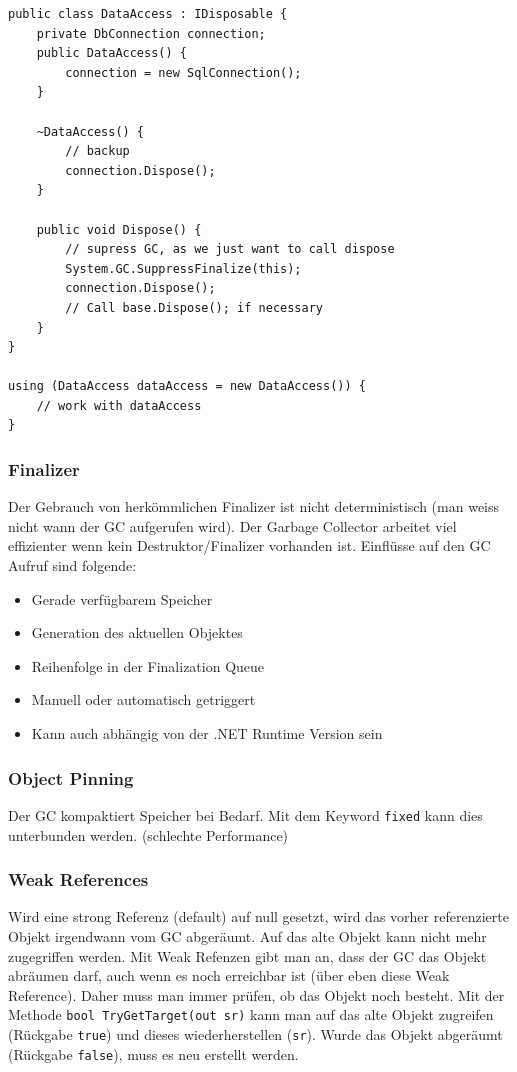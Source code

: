 \documentclass[
a4paper,
oneside,
10pt,
fleqn,
headsepline,
toc=listofnumbered, 
bibliography=totocnumbered]{scrartcl}
\begin{document}
\begin{lstlisting}
public class DataAccess : IDisposable {
	private DbConnection connection;
	public DataAccess() { 
		connection = new SqlConnection();
	}
	
	~DataAccess() {
		// backup
		connection.Dispose(); 
	}
	
	public void Dispose() {
		// supress GC, as we just want to call dispose
		System.GC.SuppressFinalize(this);
		connection.Dispose();
		// Call base.Dispose(); if necessary
	}
}

using (DataAccess dataAccess = new DataAccess()) {
	// work with dataAccess
}
\end{lstlisting}

\subsubsection{Finalizer} Der Gebrauch von herkömmlichen Finalizer ist nicht deterministisch (man weiss nicht wann der GC aufgerufen wird). Der Garbage Collector arbeitet viel effizienter wenn kein Destruktor/Finalizer vorhanden ist. Einflüsse auf den GC Aufruf sind folgende:
\begin{itemize}
	\item Gerade verfügbarem Speicher
	\item Generation des aktuellen Objektes
	\item Reihenfolge in der Finalization Queue
	\item Manuell oder automatisch getriggert
	\item Kann auch abhängig von der .NET Runtime Version sein
\end{itemize}

\subsubsection{Object Pinning} Der GC kompaktiert Speicher bei Bedarf. Mit dem Keyword \lstinline|fixed| kann dies unterbunden werden. (schlechte Performance)

\subsubsection{Weak References} Wird eine strong Referenz (default) auf null gesetzt, wird das vorher referenzierte Objekt irgendwann vom GC abgeräumt. Auf das alte Objekt kann nicht mehr zugegriffen werden. Mit Weak Refenzen gibt man an, dass der GC das Objekt abräumen darf, auch wenn es noch erreichbar ist (über eben diese Weak Reference). Daher muss man immer prüfen, ob das Objekt noch besteht. Mit der Methode \lstinline|bool TryGetTarget(out sr)| kann man auf das alte Objekt zugreifen (Rückgabe \lstinline|true|) und dieses wiederherstellen (\lstinline|sr|). Wurde das Objekt abgeräumt (Rückgabe \lstinline|false|), muss es neu erstellt werden.
\end{document}
